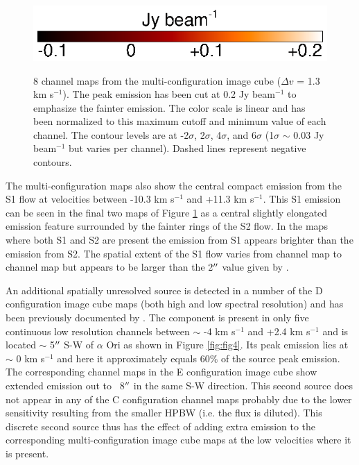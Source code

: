 \documentclass[iop]{emulateapj}
\begin{document}
\begin{figure}[hbt!]
{         }
\includegraphics[trim=0pt 20pt 0pt 5pt]{f11.ps}
\caption{8 channel maps from the multi-configuration image cube ($\Delta v$ = 1.3 km s${}^{-1}$). The peak emission has been cut at 0.2 Jy beam${{}^{-1}}$ to emphasize the fainter emission. The color scale is linear and has been normalized to this maximum cutoff and minimum value of each channel. The contour levels are at -2$\sigma$, 2$\sigma$, 4$\sigma$, and 6$\sigma$ (1$\sigma$ $\sim$ 0.03 Jy beam$^{-1}$ but varies per channel). Dashed lines represent negative contours.}
\label{fig:fig3}
\end{figure}

The multi-configuration maps also show the central compact emission from the S1 flow at velocities between -10.3 km s${}^{-1}$ and +11.3 km s${}^{-1}$. This S1 emission can be seen in the final two maps of Figure \ref{fig:fig3} as a central slightly elongated emission feature surrounded by the fainter rings of the S2 flow. In the maps where both S1 and S2 are present the emission from S1 appears brighter than the emission from S2. The spatial extent of the S1 flow varies from channel map to channel map but appears to be larger than the 2$\mbox{$^{\prime\prime}$}$ value given by \cite{2009AJ....137.3558S}. 

An additional spatially unresolved source is detected in a number of the D configuration image cube maps (both high and low spectral resolution) and has been previously documented by \citet{2009AIPC.1094..868H}. The component is present in only five continuous low resolution channels between $\sim$ -4 km s${}^{-1}$ and +2.4 km s${}^{-1}$ and is located $\sim$ 5$\mbox{$^{\prime\prime}$}$ S-W of $\alpha$ Ori as shown in Figure \ref{fig:fig4}. Its peak emission lies at $\sim$ 0 km s${}^{-1}$ and here it approximately equals 60$\%$ of the source peak emission. The corresponding channel maps in the E configuration image cube show extended emission out to ~8$\mbox{$^{\prime\prime}$}$ in the same S-W direction. This second source does not appear in any of the C configuration channel maps probably due to the lower sensitivity resulting from the smaller HPBW (i.e. the flux is diluted). This discrete second source thus has the effect of adding extra emission to the corresponding multi-configuration image cube maps at the low velocities where it is present.
\end{document}

